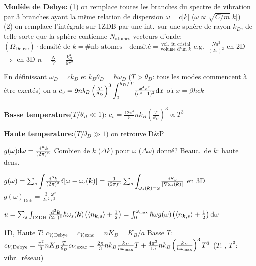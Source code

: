 \begin{squishlist}
    \item \textbf{Modèle de Debye:} (1) on remplace toutes les branches du spectre de vibration par 3 branches ayant la même relation de dispersion $\omega = c|k|$ ($\omega \propto \sqrt{C/m}|k|$) \\
    (2) on remplace l'intégrale sur 1ZDB par une int.\ sur une sphère de rayon $k_D$, de telle sorte que la sphère contienne $N_{\text{atomes}}$ vecteurs d'onde: \\
    $\left( \Omega_{\text{Debye}} \right) \cdot \text{densité de }k = \# \text{nb atomes}\quad \text{densité}=\frac{\text{vol.\ du cristal}}{\text{volume d'un }k}$ e.g.\ $\frac{N a^2}{(2\pi)^2}$ en 2D \\
    $\Longrightarrow$ en 3D $n = \frac{N}{V} = \frac{k_D^3}{6\pi^2}$
    \item En définissant $\omega_D = ck_D$ et $k_B \theta_D = \hbar \omega_D$ ($T > \theta_D$: tous les modes commencent à être excités) on a
    $c_v = 9 n k_B \left(\frac{T}{\theta_D}\right)^3 {\displaystyle \int_0^{\theta_D/T}} \frac{x^4 e^x}{(e^x - 1)^2} \textrm{d} x$ où $x = \beta \hbar c k$
    \item \textbf{Basse temperature}($T/\theta_D \ll 1$): $c_v = \frac{12\pi^4}{5} n k_B \left( \frac{T}{\theta_D}\right)^3 \propto T^3$
    \item \textbf{Haute temperature:}($T/\theta_D \gg 1$) on retrouve D\&P
\end{squishlist}

\begin{squishlist}
    \item $g(\omega) \textrm{d} \omega = \frac{\textrm{d}^n k}{(2\pi)^n}$
    \quad Combien de $k$ ($\Delta k$) pour $\omega$ ($\Delta \omega$) donné? Beauc.\ de $k$: haute dens. \\
    \item $g(\omega) = \sum_s {\displaystyle \int} \frac{\textrm{d}^3 k}{(2\pi)^3}\delta[\omega - \omega_s(\bm{k})] = \frac{1}{(2\pi)^3} \sum_s {\displaystyle \int_{\omega_s(\bm{k}) = \omega}} \frac{\textrm{d} S_{\omega}}{|\nabla \omega_s(\bm{k})|}$ en 3D \quad $g(\omega)_{\text{Deb}}= \frac{3}{2\pi^2}\frac{\omega^2}{c^3}$
    \item $u = \sum_s \int_{\text{1ZDB}} \frac{\textrm{d}^3 \bm{k}}{(2\pi)^3} \hbar \omega_s(\bm{k}) \left(\braket{n_{\bm{k}, s}} + \frac{1}{2}\right) = \int_{0}^{\omega_{\text{max}}} \hbar \omega g(\omega) \left(\braket{n_{\bm{k}, s}} + \frac{1}{2}\right)  \textrm{d} \omega$
    \item 1D, Haute $T$: $c_{V, \text{Debye}} = c_{V,\text{exac}} = n K_B = K_B / a$ \quad
    Basse $T$: $c_{V, \text{Debye}} = \frac{\pi^2}{3}nK_B \frac{T}{\theta_D} \\ c_{V,\text{exac}} = \frac{2\pi}{3} n k_B \frac{k_B}{\hbar \omega_{\max}} T + \frac{4 \pi^3}{15} nk_B \left(\frac{k_B}{\hbar \omega_{\max}}\right)^3 T^3$ \quad ($T$: \elec, $T^3$: vibr.\ réseau)
\end{squishlist}


